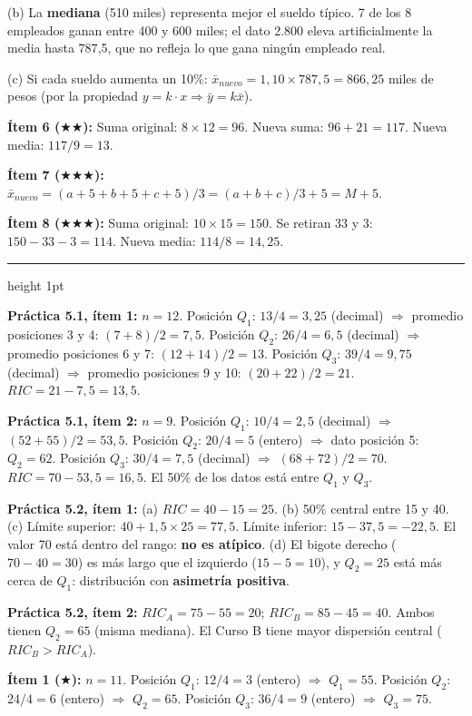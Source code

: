 \documentclass[11pt, letterpaper]{article}
\newcommand{\subbloque}[1]{%
  \vspace{14pt}
  \noindent{\large\bfseries\color{zenitnavy} #1}\par
  \vspace{4pt}\hrule height 1pt\vspace{8pt}}
\begin{document}
(b) La \textbf{mediana} (510 miles) representa mejor el sueldo típico. 7 de los 8 empleados ganan entre 400 y 600 miles; el dato 2.800 eleva artificialmente la media hasta 787{,}5, que no refleja lo que gana ningún empleado real.

(c) Si cada sueldo aumenta un 10\%: $\bar{x}_{nuevo} = 1{,}10\times787{,}5 = 866{,}25$ miles de pesos (por la propiedad $y=k\cdot x \Rightarrow \bar{y}=k\bar{x}$).

\textbf{Ítem 6 ($\bigstar\bigstar$):}
Suma original: $8\times12=96$. Nueva suma: $96+21=117$. Nueva media: $117/9=13$.

\textbf{Ítem 7 ($\bigstar\bigstar\bigstar$):}
$\bar{x}_{nuevo} = (a+5+b+5+c+5)/3 = (a+b+c)/3+5 = M+5$. \checkmark

\textbf{Ítem 8 ($\bigstar\bigstar\bigstar$):}
Suma original: $10\times15=150$. Se retiran 33 y 3: $150-33-3=114$. Nueva media: $114/8=14{,}25$.

\subbloque{Sección 5 --- Medidas de posición}

\textbf{Práctica 5.1, ítem 1:}
$n=12$. Posición $Q_1$: $13/4=3{,}25$ (decimal) $\Rightarrow$ promedio posiciones 3 y 4: $(7+8)/2=7{,}5$.
Posición $Q_2$: $26/4=6{,}5$ (decimal) $\Rightarrow$ promedio posiciones 6 y 7: $(12+14)/2=13$.
Posición $Q_3$: $39/4=9{,}75$ (decimal) $\Rightarrow$ promedio posiciones 9 y 10: $(20+22)/2=21$.
$RIC=21-7{,}5=13{,}5$.

\textbf{Práctica 5.1, ítem 2:}
$n=9$. Posición $Q_1$: $10/4=2{,}5$ (decimal) $\Rightarrow$ $(52+55)/2=53{,}5$.
Posición $Q_2$: $20/4=5$ (entero) $\Rightarrow$ dato posición 5: $Q_2=62$.
Posición $Q_3$: $30/4=7{,}5$ (decimal) $\Rightarrow$ $(68+72)/2=70$.
$RIC=70-53{,}5=16{,}5$. El 50\% de los datos está entre $Q_1$ y $Q_3$.

\textbf{Práctica 5.2, ítem 1:}
(a) $RIC=40-15=25$.
(b) 50\% central entre 15 y 40.
(c) Límite superior: $40+1{,}5\times25=77{,}5$. Límite inferior: $15-37{,}5=-22{,}5$. El valor 70 está dentro del rango: \textbf{no es atípico}.
(d) El bigote derecho ($70-40=30$) es más largo que el izquierdo ($15-5=10$), y $Q_2=25$ está más cerca de $Q_1$: distribución con \textbf{asimetría positiva}.

\textbf{Práctica 5.2, ítem 2:}
$RIC_A=75-55=20$; $RIC_B=85-45=40$. Ambos tienen $Q_2=65$ (misma mediana). El Curso B tiene mayor dispersión central ($RIC_B>RIC_A$).

\textbf{Ítem 1 ($\bigstar$):}
$n=11$. Posición $Q_1$: $12/4=3$ (entero) $\Rightarrow$ $Q_1=55$.
Posición $Q_2$: $24/4=6$ (entero) $\Rightarrow$ $Q_2=65$.
Posición $Q_3$: $36/4=9$ (entero) $\Rightarrow$ $Q_3=75$.
\end{document}
